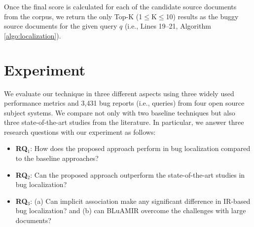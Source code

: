 \documentclass[sigconf,review,anonymous]{acmart}
\begin{document}
Once the final score is calculated for each of the candidate source documents from the corpus, we return the only Top-K (1$\le$K$\le$10) results as the buggy source documents for the given query $q$ (i.e.,  Lines 19--21, Algorithm \ref{algo:localization}).

\section{Experiment} \label{sec:expANDdiss}
We evaluate our technique in three different aspects using
three widely used performance metrics and 3,431 bug reports (i.e.,
queries) from four open source subject systems. We compare not only with two baseline techniques \cite{vector-space-model,MarcusLSI} but also three state-of-the-art studies \cite{Nguyen,Jian,Saha} from the literature. In particular, we answer three research questions with our experiment as follows: 
\begin{itemize}
	\item \textbf{RQ$_1$}: How does the proposed approach perform in bug localization compared to the baseline approaches? 
	\item \textbf{RQ$_2$}: Can the proposed approach outperform the state-of-the-art studies in bug localization?
	\item \textbf{RQ$_3$}: (a) Can implicit association make any significant difference in IR-based bug localization? and (b) can BLuAMIR overcome the challenges with large documents?   
\end{itemize}

\begin{table}[!tb]
	\caption{Experimental Dataset}
	\label{tab:DDSl}
	\vspace{-.3cm}
\end{table}
\end{document}
